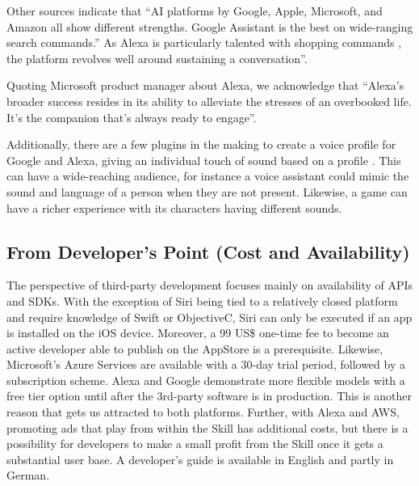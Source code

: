 Other sources indicate that ``AI platforms by Google, Apple, Microsoft, and Amazon all show different strengths. Google Assistant is the best on wide-ranging search commands.'' \cite{mit:Alexa} %
As Alexa is particularly talented with shopping commands \cite{mit:Alexa}, the platform revolves well around sustaining a conversation''. %

Quoting Microsoft product manager about Alexa, we acknowledge that ``Alexa’s broader success resides in its ability to alleviate the stresses of an overbooked life. It’s the companion that’s always ready to engage''\cite{darrenAustin}.

Additionally, there are a few plugins in the making to create a voice profile for Google and Alexa, giving an individual touch of sound based on a profile \cite{alexa_19}. This can have a wide-reaching  audience, for instance a voice assistant could mimic the sound and language of a person when they are not present. Likewise, a game can have a richer experience with its characters having different sounds.

%
%	
%	
%	

\subsection*{From Developer's Point (Cost and Availability)}

The perspective of third-party development focuses mainly on availability of APIs and SDKs. With the exception of Siri being tied to a relatively closed platform and require knowledge of Swift or ObjectiveC, Siri can only be executed if an app is installed on the iOS device.
Moreover, a 99 US\$ one-time fee to become an active developer able to publish on the AppStore is a prerequisite.
Likewise, Microsoft's Azure Services are available with a 30-day trial period, followed by a subscription scheme.
Alexa and Google demonstrate more flexible models with a free tier option %
until after the 3rd-party software is in production. This is another reason that gets us attracted to both platforms. Further, with Alexa and AWS, promoting ads that play from within the Skill has additional costs, but there is a possibility for developers to make a small profit from the Skill once it gets a substantial user base. A developer's guide is available in English and partly in German.

